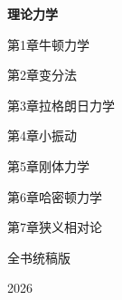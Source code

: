 \documentclass[UTF8,fontset=none,11pt,oneside,openany,a4paper]{ctexbook}
\begin{document}
\frontmatter
\begin{titlepage}
\centering
\vspace*{3cm}
{\Huge\bfseries 理论力学\par}
\vspace{0.8cm}
{\large 第1章\quad 牛顿力学\par}
\vspace{0.15cm}
{\large 第2章\quad 变分法\par}
\vspace{0.15cm}
{\large 第3章\quad 拉格朗日力学\par}
\vspace{0.15cm}
{\large 第4章\quad 小振动\par}
\vspace{0.15cm}
{\large 第5章\quad 刚体力学\par}
\vspace{0.15cm}
{\large 第6章\quad 哈密顿力学\par}
\vspace{0.15cm}
{\large 第7章\quad 狭义相对论\par}
\vspace{0.15cm}
\vspace{1.2cm}
{\large 全书统稿版\par}
\vfill
{\large 2026\par}
\end{titlepage}

\tableofcontents

\mainmatter








\end{document}
